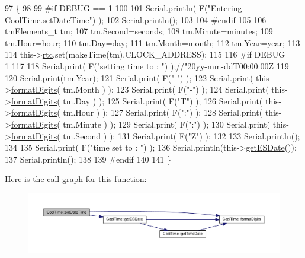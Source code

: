 \begin{DoxyCode}
97 \{ 
98 
99 \textcolor{preprocessor}{#if DEBUG == 1}
100 
101     Serial.println( F(\textcolor{stringliteral}{"Entering CoolTime.setDateTime"}) );
102     Serial.println();
103 
104 \textcolor{preprocessor}{#endif}
105 
106     tmElements\_t tm;
107     tm.Second=seconds; 
108     tm.Minute=minutes; 
109     tm.Hour=hour; 
110     tm.Day=day;
111     tm.Month=month; 
112     tm.Year=year;
113     
114     this->\hyperlink{classCoolTime_abd38f2384ff90692b1568d9db869412e}{rtc}.set(makeTime(tm),CLOCK\_ADDRESS);   
115 
116 \textcolor{preprocessor}{#if DEBUG == 1}
117 
118     Serial.print( F(\textcolor{stringliteral}{"setting time to : "}) );\textcolor{comment}{//"20yy-mm-ddT00:00:00Z}
119 
120     Serial.print(tm.Year);
121     Serial.print( F(\textcolor{stringliteral}{"-"}) );
122     Serial.print( this->\hyperlink{classCoolTime_acd537cd4210d7bde4e1f5c47d2ac0456}{formatDigits}( tm.Month ) );
123     Serial.print( F(\textcolor{stringliteral}{"-"}) );
124     Serial.print( this->\hyperlink{classCoolTime_acd537cd4210d7bde4e1f5c47d2ac0456}{formatDigits}( tm.Day ) );
125     Serial.print( F(\textcolor{stringliteral}{"T"}) );
126     Serial.print( this->\hyperlink{classCoolTime_acd537cd4210d7bde4e1f5c47d2ac0456}{formatDigits}( tm.Hour ) );
127     Serial.print( F(\textcolor{stringliteral}{":"}) );
128     Serial.print( this->\hyperlink{classCoolTime_acd537cd4210d7bde4e1f5c47d2ac0456}{formatDigits}( tm.Minute ) );
129     Serial.print( F(\textcolor{stringliteral}{":"}) );
130     Serial.print( this->\hyperlink{classCoolTime_acd537cd4210d7bde4e1f5c47d2ac0456}{formatDigits}( tm.Second ) );
131     Serial.print( F(\textcolor{stringliteral}{"Z"}) );
132 
133     Serial.println();
134     
135     Serial.print( F(\textcolor{stringliteral}{"time set to : "}) );
136     Serial.println(this->\hyperlink{classCoolTime_ac4f32ee513c1328d984306645e8785a4}{getESDate}());
137     Serial.println();
138 
139 \textcolor{preprocessor}{#endif}
140 
141 \}
\end{DoxyCode}
Here is the call graph for this function\+:\nopagebreak
\begin{figure}[H]
\begin{center}
\leavevmode
\includegraphics[width=350pt]{classCoolTime_ab81ea7fdaace111aa01cc1ec84c6d297_cgraph}
\end{center}
\end{figure}
\mbox{\label{classCoolTime_aae601f795452cfa48d9fb337aed483a8}} 
